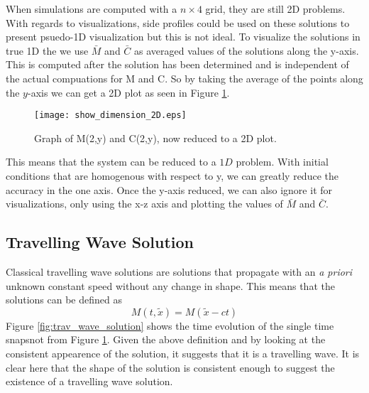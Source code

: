When simulations are computed with a $n \times 4$ grid, they are still 2D problems.
With regards to visualizations, side profiles could be used on these solutions to present psuedo-1D visualization but this is not ideal.
To visualize the solutions in true 1D the we use $\bar{M}$ and $\bar{C}$ as averaged values of the solutions along the y-axis.
This is computed after the solution has been determined and is independent of the actual compuations for M and C.
So by taking the average of the points along the $y$-axis we can get a 2D plot as seen in Figure \ref{fig:show_dimension_2D}. 
 
\begin{figure}[h!bt]
  \begin{center}
    \texttt{[image: show\_dimension\_2D.eps]}
    \caption{Graph of M(2,y) and C(2,y), now reduced to a 2D plot.}
    \label{fig:show_dimension_2D}
  \end{center}
\end{figure}

This means that the system can be reduced to a $1D$ problem.
With initial conditions that are homogenous with respect to y, we can greatly reduce the accuracy in the one axis.
Once the y-axis reduced, we can also ignore it for visualizations, only using the x-z axis and plotting the values of $\bar{M}$ and $\bar{C}$.


\subsection{Travelling Wave Solution}


Classical travelling wave solutions are solutions that propagate with an \textit{a priori} unknown constant speed without any change in shape.
This means that the solutions can be defined as 
\begin{equation}
  M(t,\tilde{x}) = M(\tilde{x} - ct)
\end{equation}
Figure \ref{fig:trav_wave_solution} shows the time evolution of the single time snapsnot from Figure \ref{fig:show_dimension_2D}.
Given the above definition and by looking at the consistent appearence of the solution, it suggests that it is a travelling wave.
It is clear here that the shape of the solution is consistent enough to suggest the existence of a travelling wave solution.

